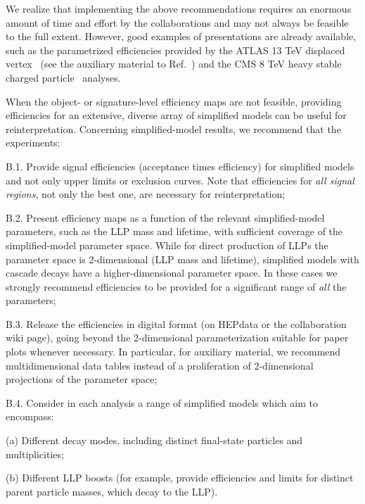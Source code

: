 \noindent
%
We realize that implementing the above recommendations requires an enormous amount of time and effort by
the collaborations and may not always be feasible to the full extent.
However, good examples of presentations are already available, such as
the parametrized efficiencies provided by the ATLAS 13 TeV displaced
vertex~\cite{Aaboud:2017iio} (see the auxiliary material to Ref.~\cite{SUSY-2016-08}) and the CMS 8 TeV heavy stable
charged particle~\cite{Khachatryan:2015lla} analyses.

When the object- or signature-level efficiency maps are not feasible, providing efficiencies for an extensive, diverse array of simplified models can be useful for reinterpretation.
Concerning simplified-model results, we recommend that the experiments:
\begin{description*}
  \item[B.1.] Provide signal efficiencies (acceptance times efficiency) for
  simplified models and not only upper limits or exclusion curves.
  Note that efficiencies for {\it{all signal regions}}, not only the best one, are necessary for reinterpretation;
  \item[B.2.] Present efficiency maps as a function of the relevant simplified-model parameters, such as the LLP mass and lifetime, with sufficient coverage of the simplified-model parameter space. While for direct production of LLPs the parameter space is 2-dimensional
  (LLP mass and lifetime), simplified models with cascade decays have a higher-dimensional parameter space. In these cases we strongly recommend
  efficiencies to be provided for a significant range of {\it all} the
  parameters;
  \item[B.3.] Release the efficiencies in digital format (on HEPdata or the collaboration wiki page), going beyond the 2-dimensional parameterization suitable for paper plots whenever necessary. In particular, for auxiliary material, we recommend multidimensional data tables instead of a proliferation of 2-dimensional projections
  of the parameter space;
  \item[B.4.] Consider in each analysis a range of simplified models which aim to encompass:
\begin{description*}
    \item[(a)] Different decay modes, including distinct final-state particles and multiplicities;
    \item[(b)] Different LLP boosts (for example, provide efficiencies and limits
        for distinct parent particle masses, which decay to the LLP).
\end{description*}
\end{description*}

